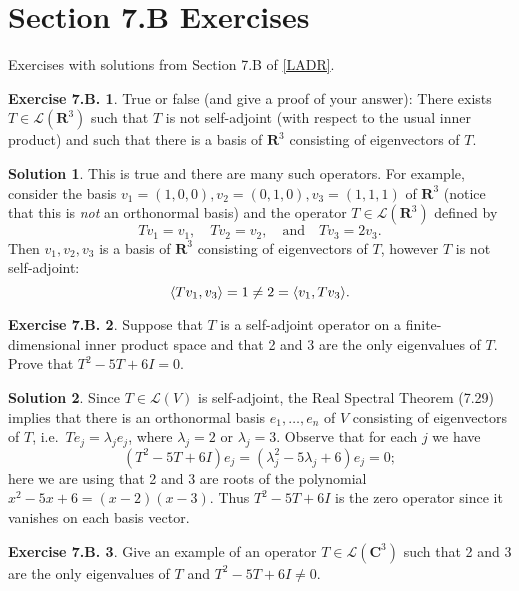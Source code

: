 \documentclass[12pt]{article}
\theoremstyle{definition}
\theoremstyle{exercise}
\newtheorem{exercise}{Exercise 7.B.}
\theoremstyle{solution}
\newtheorem*{solution}{Solution}
\newcommand{\lmap}{\mathcal{L}}
\newcommand{\quand}{\quad \text{and} \quad}
\newcommand{\R}{\mathbf{R}}
\newcommand{\C}{\mathbf{C}}
\DeclarePairedDelimiter\ip{\langle}{\rangle}
\begin{document}
\section{Section 7.B Exercises}

Exercises with solutions from Section 7.B of \hyperlink{ladr}{[LADR]}.

\begin{exercise}
\label{ex:1}
    True or false (and give a proof of your answer): There exists \( T \in \lmap(\R^3) \) such that \( T \) is not self-adjoint (with respect to the usual inner product) and such that there is a basis of \( \R^3 \) consisting of eigenvectors of \( T \).
\end{exercise}

\begin{solution}
    This is true and there are many such operators. For example, consider the basis \( v_1 = (1, 0, 0), v_2 = (0, 1, 0), v_3 = (1, 1, 1) \) of \( \R^3 \) (notice that this is \textit{not} an orthonormal basis) and the operator \( T \in \lmap(\R^3) \) defined by
    \[
        Tv_1 = v_1, \quad Tv_2 = v_2, \quand Tv_3 = 2 v_3.
    \]
    Then \( v_1, v_2, v_3 \) is a basis of \( \R^3 \) consisting of eigenvectors of \( T \), however \( T \) is not self-adjoint:
    \[
        \ip{Tv_1, v_3} = 1 \neq 2 = \ip{v_1, Tv_3}.
    \]
\end{solution}

\begin{exercise}
\label{ex:2}
    Suppose that \( T \) is a self-adjoint operator on a finite-dimensional inner product space and that 2 and 3 are the only eigenvalues of \( T \). Prove that \( T^2 - 5T + 6I = 0 \).
\end{exercise}

\begin{solution}
    Since \( T \in \lmap(V) \) is self-adjoint, the Real Spectral Theorem (7.29) implies that there is an orthonormal basis \( e_1, \ldots, e_n \) of \( V \) consisting of eigenvectors of \( T \), i.e.\ \( Te_j = \lambda_j e_j \), where \( \lambda_j = 2 \) or \( \lambda_j = 3 \). Observe that for each \( j \) we have
    \[
        (T^2 - 5T + 6I) e_j = (\lambda_j^2 - 5 \lambda_j + 6) e_j = 0;
    \]
    here we are using that 2 and 3 are roots of the polynomial \( x^2 - 5x + 6 = (x - 2)(x - 3) \). Thus \( T^2 - 5T + 6I \) is the zero operator since it vanishes on each basis vector.
\end{solution}

\begin{exercise}
\label{ex:3}
    Give an example of an operator \( T \in \lmap(\C^3) \) such that 2 and 3 are the only eigenvalues of \( T \) and \( T^2 - 5T + 6I \neq 0 \).
\end{exercise}
\end{document}
